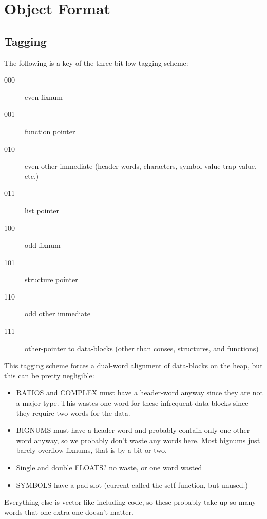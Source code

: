 \chapter{Object Format}



\label{sec:tagging}

\section{Tagging}

The following is a key of the three bit low-tagging scheme:
\begin{description}
   \item[000] even fixnum
   \item[001] function pointer
   \item[010] even other-immediate (header-words, characters, symbol-value trap value, etc.)
   \item[011] list pointer
   \item[100] odd fixnum
   \item[101] structure pointer
   \item[110] odd other immediate
  \item[111] other-pointer to data-blocks (other than conses, structures,
                                     and functions)
\end{description}

This tagging scheme forces a dual-word alignment of data-blocks on the heap,
but this can be pretty negligible: 
\begin{itemize}
\item   RATIOS and COMPLEX must have a header-word anyway since they are not a
      major type.  This wastes one word for these infrequent data-blocks since
      they require two words for the data.

\item BIGNUMS must have a header-word and probably contain only one other word
      anyway, so we probably don't waste any words here.  Most bignums just
      barely overflow fixnums, that is by a bit or two.

\item   Single and double FLOATS?
      no waste, or
      one word wasted

\item   SYMBOLS have a pad slot (current called the setf function, but unused.)
\end{itemize}
Everything else is vector-like including code, so these probably take up
so many words that one extra one doesn't matter.



